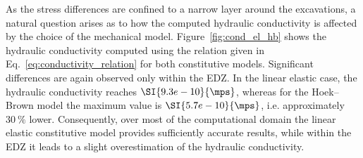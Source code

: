As the stress differences are confined to a narrow layer around the excavations, a natural question arises as to how the computed hydraulic conductivity is affected by the choice of the mechanical model.
Figure~\ref{fig:cond_el_hb} shows the hydraulic conductivity computed using the relation given in Eq.~\eqref{eq:conductivity_relation} for both constitutive models.
Significant differences are again observed only within the \gls{EDZ}.
In the linear elastic case, the hydraulic conductivity reaches $\SI{9.3e-10}{\mps}$, whereas for the Hoek–Brown model the maximum value is $\SI{5.7e-10}{\mps}$, i.e. approximately $30~\%$ lower.
Consequently, over most of the computational domain the linear elastic constitutive model provides sufficiently accurate results, while within the \gls{EDZ} it leads to a slight overestimation of the hydraulic conductivity.


